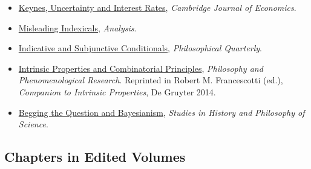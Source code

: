 \documentclass[
  10pt,
  letterpaper,
  DIV=11,
  numbers=noendperiod,
  twoside]{scrartcl}
\begin{document}
\begin{itemize}
\item
  \href{https://brian.weatherson.org/quarto/posts/kuir/keynes-uncertainty-and-interest-rates.html}{Keynes,
  Uncertainty and Interest Rates}, \emph{Cambridge Journal of
  Economics}.
\item
  \href{https://brian.weatherson.org/quarto/posts/misindex/misleading-indexicals.html}{Misleading
  Indexicals}, \emph{Analysis}.
\item
  \href{https://brian.weatherson.org/quarto/posts/indsub/indicative-and-subjunctive-conditionals.html}{Indicative
  and Subjunctive Conditionals}, \emph{Philosophical Quarterly}.
\item
  \href{https://brian.weatherson.org/quarto/posts/ipacp/intrinsic-properties-and-combinatorial-principles.html}{Intrinsic
  Properties and Combinatorial Principles}, \emph{Philosophy and
  Phenomenological Research}. Reprinted in Robert M. Francescotti (ed.),
  \emph{Companion to Intrinsic Properties}, De Gruyter 2014.
\item
  \href{https://brian.weatherson.org/quarto/posts/bqb/begging-the-question-and-bayesians.html}{Begging
  the Question and Bayesianism}, \emph{Studies in History and Philosophy
  of Science}.
\end{itemize}

\subsection{Chapters in Edited
Volumes}\label{chapters-in-edited-volumes}
\end{document}
